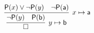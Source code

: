 \[
\infer[x\mapsto \ma]{
	\infer[y\mapsto \mb]{\emptyclause}{
		\lnot\mP(y)&\mP(\mb)
		}
	}{\mP(x)\lor\lnot\mP(y)&\lnot\mP(\ma)
			}
			\]